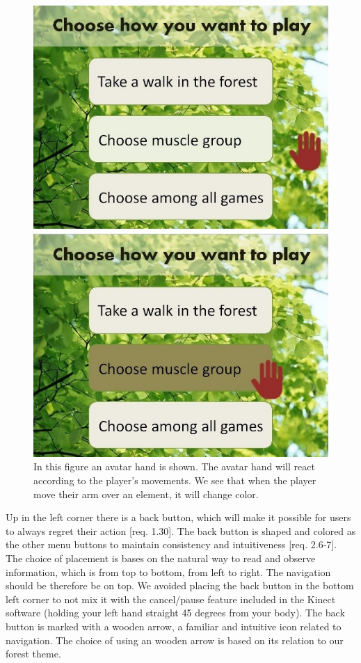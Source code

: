 \begin{figure} [H]
\centering
\includegraphics[scale=0.5]{menuAction.jpg}
\caption[Menu - Action and response]{In this figure an avatar hand is shown. The avatar hand will react according to the player's movements. We see that when the player move their arm over an element, it will change color.}
\label{fig:avatarAction}
\end{figure} 

Up in the left corner there is a back button, which will make it possible for users to always regret their action [req. 1.30]. The back button is shaped and colored as the other menu buttons to maintain consistency and intuitiveness [req. 2.6-7]. The choice of placement is bases on the natural way to read and observe information, which is from top to bottom, from left to right. The navigation should be therefore be on top. We avoided placing the back button in the bottom left corner to not mix it with the cancel/pause feature included in the Kinect software (holding your left hand straight 45 degrees from your body). The back button is marked with a wooden arrow, a familiar and intuitive icon related to navigation. The choice of using an wooden arrow is based on its relation to our forest theme. 

